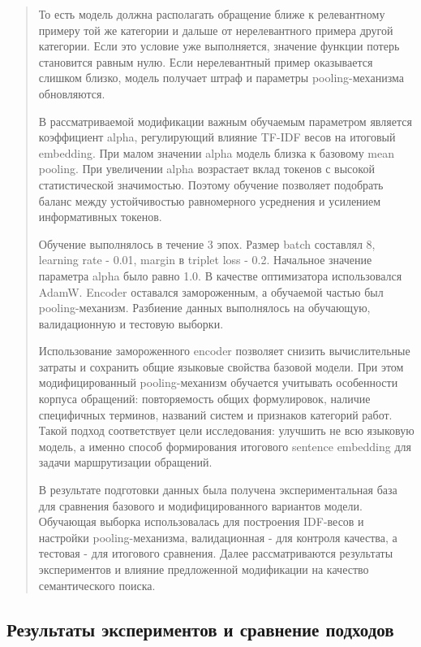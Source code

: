 \begin{quote}
То есть модель должна располагать обращение ближе к релевантному примеру
той же категории и дальше от нерелевантного примера другой категории.
Если это условие уже выполняется, значение функции потерь становится
равным нулю. Если нерелевантный пример оказывается слишком близко,
модель получает штраф и параметры pooling-механизма обновляются.

В рассматриваемой модификации важным обучаемым параметром является
коэффициент alpha, регулирующий влияние TF-IDF весов на итоговый
embedding. При малом значении alpha модель близка к базовому mean
pooling. При увеличении alpha возрастает вклад токенов с высокой
статистической значимостью. Поэтому обучение позволяет подобрать баланс
между устойчивостью равномерного усреднения и усилением информативных
токенов.

Обучение выполнялось в течение 3 эпох. Размер batch составлял 8,
learning rate - 0.01, margin в triplet loss - 0.2. Начальное значение
параметра alpha было равно 1.0. В качестве оптимизатора использовался
AdamW. Encoder оставался замороженным, а обучаемой частью был
pooling-механизм. Разбиение данных выполнялось на обучающую,
валидационную и тестовую выборки.

Использование замороженного encoder позволяет снизить вычислительные
затраты и сохранить общие языковые свойства базовой модели. При этом
модифицированный pooling-механизм обучается учитывать особенности
корпуса обращений: повторяемость общих формулировок, наличие специфичных
терминов, названий систем и признаков категорий работ. Такой подход
соответствует цели исследования: улучшить не всю языковую модель, а
именно способ формирования итогового sentence embedding для задачи
маршрутизации обращений.

В результате подготовки данных была получена экспериментальная база для
сравнения базового и модифицированного вариантов модели. Обучающая
выборка использовалась для построения IDF-весов и настройки
pooling-механизма, валидационная - для контроля качества, а тестовая -
для итогового сравнения. Далее рассматриваются результаты экспериментов
и влияние предложенной модификации на качество семантического поиска.
\end{quote}

\hypertarget{ux440ux435ux437ux443ux43bux44cux442ux430ux442ux44b-ux44dux43aux441ux43fux435ux440ux438ux43cux435ux43dux442ux43eux432-ux438-ux441ux440ux430ux432ux43dux435ux43dux438ux435-ux43fux43eux434ux445ux43eux434ux43eux432}{%
\subsection{Результаты экспериментов и сравнение
подходов}\label{ux440ux435ux437ux443ux43bux44cux442ux430ux442ux44b-ux44dux43aux441ux43fux435ux440ux438ux43cux435ux43dux442ux43eux432-ux438-ux441ux440ux430ux432ux43dux435ux43dux438ux435-ux43fux43eux434ux445ux43eux434ux43eux432}}

